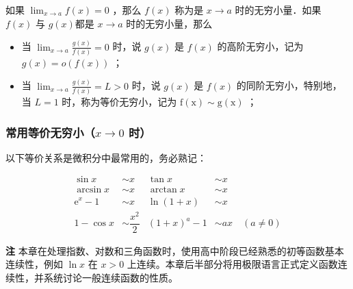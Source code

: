 \documentclass[fontset=fandol]{ctexart}
\newenvironment{remark}{\par\noindent\textbf{注}\quad}{\par\vspace{0.8em}}
\newcommand{\ee}{\mathrm{e}}
\begin{document}
\begin{definition}[无穷小量]
	如果 $\lim _{x \rightarrow a} f(x)=0$ ，那么 $f(x)$ 称为是 $x \rightarrow a$ 时的无穷小量．如果 $f(x)$ 与 $g(x)$都是 $x \rightarrow a$ 时的无穷小量，那么
	\begin{itemize}
		\item[1．] 当 $\lim _{x \rightarrow a} \frac{g(x)}{f(x)}=0$ 时，说 $g(x)$ 是 $f(x)$ 的高阶无穷小，记为 $g(x)=o(f(x))$ ；
		\item[2．] 当 $\lim _{x \rightarrow a} \frac{g(x)}{f(x)}=L>0$ 时，说 $g(x)$ 是 $f(x)$ 的同阶无穷小，特别地，当 $L=1$ 时，称为等价无穷小，记为 $\mathrm{f}(\mathrm{x}) \sim \mathrm{g}(\mathrm{x})$ ；
	\end{itemize}

\end{definition}







\subsubsection{\texorpdfstring{常用等价无穷小（\(x \to 0\) 时）}{常用等价无穷小（x 趋于 0 时）}}

以下等价关系是微积分中最常用的，务必熟记：

\[
\boxed{
\begin{aligned}
\sin x &\sim x & \tan x &\sim x \\
\arcsin x &\sim x & \arctan x &\sim x \\
\ee^x - 1 &\sim x & \ln(1+x) &\sim x \\
1 - \cos x &\sim \dfrac{x^2}{2} & (1+x)^a - 1 &\sim ax \quad (a \neq 0)
\end{aligned}
}
\]

\begin{remark}
本章在处理指数、对数和三角函数时，使用高中阶段已经熟悉的初等函数基本连续性，例如 $\ln x$ 在 $x>0$ 上连续。本章后半部分将用极限语言正式定义函数连续性，并系统讨论一般连续函数的性质。
\end{remark}
\end{document}
